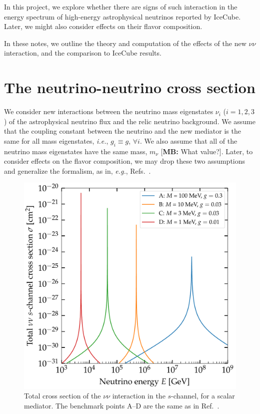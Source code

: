 \documentclass[aps,twocolumn,prd,showpacs,showkeys,preprintnumbers,superscriptaddress,nobibnotes,floatfix,longbibliography]{revtex4-1}
\newcommand{\ie}{{\it i.e.}}
\newcommand{\eg}{{\it e.g.}}
\newcommand{\Ref}{Ref.}
\newcommand{\Refs}{Refs.}
\newcommand{\MB}[1]{{\color{blue}[{\bf MB:} #1]}}
\begin{document}
In this project, we explore whether there are signs of such interaction in the energy spectrum of high-energy astrophysical neutrinos reported by IceCube.  Later, we might also consider effects on their flavor composition.

In these notes, we outline the theory and computation of the effects of the new $\nu \nu$ interaction, and the comparison to IceCube results.




\section{The neutrino-neutrino cross section}\label{section:cross_section}

We consider new interactions between the neutrino mass eigenstates $\nu_i$ ($i=1,2,3$) of the astrophysical neutrino flux and the relic neutrino background.  We assume that the coupling constant between the neutrino and the new mediator is the same for all mass eigenstates, \ie, $g_i \equiv g$, $\forall i$.  We also assume that all of the neutrino mass eigenstates have the same mass, $m_\nu$  \MB{What value?}. Later, to consider effects on the flavor composition, we may drop these two assumptions and generalize the formalism, as in, \eg, \Refs\ \cite{Farzan:2014gza, DiFranzo:2015qea}.

\begin{figure}[t!]
 \centering
 \includegraphics[width=\columnwidth]{cs_nu_nu_s_channel_scalar.pdf}
 \caption{\label{fig:total_cs_s_channel_scalar}Total cross section of the $\nu\nu$ interaction in the $s$-channel, for a scalar mediator.  The benchmark points A--D are the same as in \Ref\ \cite{Ng:2014pca}.}
\end{figure}
\end{document}
